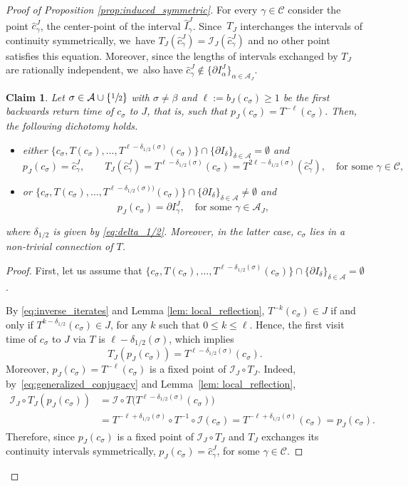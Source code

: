 \documentclass[10pt,a4paper]{amsart}
\theoremstyle{plain}
\newtheorem{claim}{Claim}
\theoremstyle{definition}
\newcommand{\A}{\mathcal{A}}
\newcommand{\I}{\mathcal{I}}
\begin{document}
\begin{proof}[Proof of Proposition \ref{prop:induced_symmetric}]
For every $\gamma\in\mathcal C$ consider the point $\hat c_\gamma^J$, the center-point of the interval $\hat I^J_{\gamma}$. Since~$T_J$ interchanges the intervals of continuity symmetrically, we~have $T_J(\hat c_\gamma^J)=\I_J(\hat c_\gamma^J)$ and no other point satisfies this equation. Moreover, since the lengths of intervals exchanged by $T_J$ are rationally independent, we~also have $\hat c_\gamma^J \notin\{\partial I^J_{\alpha}\}_{\alpha\in\A_J}$.

\begin{claim}
\label{cl:backward_centers}
Let $\sigma \in \A \cup \{\sfrac{1}{2}\}$ with $\sigma \neq \beta$ and $\ell := b_J(c_\sigma) \geq 1$ be the first backwards return time of $c_\sigma$ to $J$, that is, such that $p_J(c_\sigma) = T^{-\ell}(c_\sigma)$. Then, the following dichotomy holds.
\begin{itemize}
\item either $\{c_\sigma, T(c_\sigma), \ldots, T^{\ell - \delta_{1/2}(\sigma)}(c_\sigma)\} \cap \{\partial I_\delta\}_{\delta \in \A} = \emptyset$ and
\[
p_J(c_\sigma) = \hat c_\gamma^J,\qquad T_J(\hat c_\gamma^J) = T^{\ell - \delta_{1/2}(\sigma)}(c_\sigma) = T^{2\ell - \delta_{1/2}(\sigma)}(\hat c_\gamma^J), \quad \text{for some } \gamma \in \mathcal C,
\]
\item or $\{c_\sigma, T(c_\sigma), \ldots, T^{\ell - \delta_{1/2}(\sigma))}(c_\sigma)\} \cap \{\partial I_\delta\}_{\delta \in \A} \neq \emptyset$ and
\[
p_J(c_\sigma) = \partial I_\gamma^J,\quad\text{for some } \gamma \in \A_J,
\]
\end{itemize}
where $\delta_{1/2}$ is given by \eqref{eq:delta_1/2}. Moreover, in the latter case, $c_\sigma$ lies in a non-trivial connection of $T$.
\end{claim}

\begin{proof}
First, let us assume that $\{c_\sigma, T(c_\sigma), \ldots, T^{\ell - \delta_{1/2}(\sigma)}(c_\sigma)\} \cap \{\partial I_\delta\}_{\delta \in \A} = \emptyset$.

By \eqref{eq:inverse_iterates} and Lemma \ref{lem: local_reflection},
$T^{-k}(c_\sigma) \in J$ if and only if $T^{k - \delta_{1/2}}(c_\sigma) \in J$,
for any $k$ such that $0 \leq k \leq \ell$. Hence, the first visit time of $c_\sigma$ to $J$
via $T$ is $\ell - \delta_{1/2}(\sigma)$, which implies
\[
T_J(p_J(c_\sigma)) = T^{\ell - \delta_{1/2}(\sigma)}(c_\sigma).
\]
Moreover, $p_J(c_\sigma) = T^{-\ell}(c_\sigma)$ is a fixed point of $\I_J \circ T_J$. Indeed, by~\eqref{eq:generalized_conjugacy} and Lemma~\ref{lem: local_reflection},
\begin{align*}
\I_J \circ T_J(p_J(c_\sigma)) &= \I \circ T \big( T^{\ell -
\delta_{1/2}(\sigma)}(c_\sigma) \big) \\
&= T^{-\ell + \delta_{1/2}(\sigma)}\circ
T^{-1} \circ \I (c_\sigma) = T^{-\ell + \delta_{1/2}(\sigma)} (c_\sigma) =
p_J(c_\sigma).
\end{align*}
Therefore, since $p_J(c_\sigma)$ is a fixed point of $\I_J \circ T_J$ and $T_J$ exchanges its continuity intervals symmetrically, $p_J(c_\sigma) = \hat c_\gamma^J$, for some $\gamma \in \mathcal C$.


\end{proof}
\end{proof}
\end{document}
